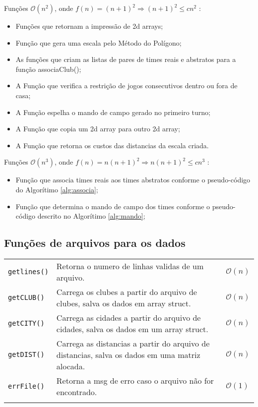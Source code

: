 \documentclass[12pt,a4paper]{article}
\begin{document}
Funções $\mathcal{O}(n^2)$, onde $f(n) = (n+1)^2 \Rightarrow (n+1)^2 \leqslant cn^2$ :

\begin{itemize}
	\setlength\itemsep{1pt}
	\item Funções que retornam a impressão de 2d arrays; 
	\item Função que gera uma escala pelo Método do Polígono;
	\item As funções que criam as listas de pares de times reais e abstratos para a função associaClub();
	\item A Função que verifica a restrição de jogos consecutivos dentro ou fora de casa;
	\item A Função espelha o mando de campo gerado no primeiro turno;
	\item A Função que copia um 2d array para outro 2d array;
	\item A Função que retorna os custos das distancias da escala criada.
\end{itemize}

Funções $\mathcal{O}(n^3)$, onde $f(n) = n(n+1)^2 \Rightarrow n(n+1)^2 \leqslant cn^3$ :

\begin{itemize}
	\setlength\itemsep{1pt}
	\item Função que associa times reais aos times abstratos conforme o pseudo-código do Algorítimo \ref{alg:associa}; 
	\item Função que determina o mando de campo dos times conforme o pseudo-código descrito no Algorítimo \ref{alg:mando};
\end{itemize}

\subsection{Funções de arquivos para os dados}

\begin{longtable}{p{3cm} p{11cm} p{1cm}}
	\texttt{getlines()} & Retorna o numero de linhas validas de um arquivo. & $\mathcal{O}(n)$ \\
	\texttt{getCLUB()} & Carrega os clubes a partir do arquivo de clubes, salva os dados em array struct. & $\mathcal{O}(n)$ \\
	\texttt{getCITY()} & Carrega as cidades a partir do arquivo de cidades, salva os dados em um array struct. & $\mathcal{O}(n)$ \\
	\texttt{getDIST()} & Carrega as distancias a partir do arquivo de distancias, salva os dados em uma matriz alocada. & $\mathcal{O}(n)$ \\
	\texttt{errFile()} & Retorna a msg de erro caso o arquivo não for encontrado. & $\mathcal{O}(1)$ \\
	\label{tab:files}
\end{longtable}
\vspace{-0.5cm}
\end{document}
